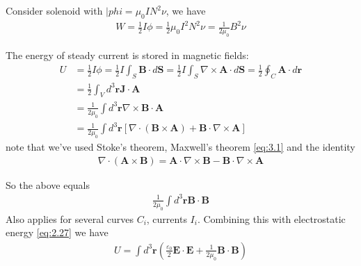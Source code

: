 \documentclass[a4paper]{article}
\begin{document}
\begin{eg}
Consider solenoid with $|phi=\mu_0 IN^2 \nu$, we have
\begin{equation*}
\begin{aligned}
W = \frac{1}{2}I\phi = \frac{1}{2} \mu_0 I^2 N^2 \nu = \frac{1}{2\mu_0} B^2 \nu
\end{aligned}
\end{equation*}

The energy of steady current is stored in magnetic fields:
\begin{equation*}
\begin{aligned}
U &= \frac{1}{2} I \phi = \frac{1}{2} I \int_S \mathbf{B} \cdot d\mathbf{S} = \frac{1}{2} I \int_S \nabla \times \mathbf{A} \cdot d\mathbf{S} = \frac{1}{2} \oint_C \mathbf{A} \cdot d\mathbf{r}\\
&= \frac{1}{2} \int_V d^3 \mathbf{r} \mathbf{J} \cdot \mathbf{A}\\
&= \frac{1}{2\mu_0} \int d^3 \mathbf{r} \nabla \times \mathbf{B} \cdot \mathbf{A}\\
&= \frac{1}{2\mu_0} \int d^3 \mathbf{r} [\nabla \cdot (\mathbf{B} \times \mathbf{A}) + \mathbf{B} \cdot \nabla \times \mathbf{A}]
\end{aligned}
\end{equation*}
note that we've used Stoke's theorem, Maxwell's theorem \eqref{eq:3.1} and  the identity
\begin{equation*}
\begin{aligned}
\nabla \cdot (\mathbf{A} \times \mathbf{B}) = \mathbf{A} \cdot \nabla \times \mathbf{B} - \mathbf{B} \cdot \nabla \times \mathbf{A}
\end{aligned}
\end{equation*}
\end{eg}
So the above equals
\begin{equation*}\tag{4.12} \label{eq:4.12}
\begin{aligned}
\frac{1}{2\mu_0} \int d^3 \mathbf{r} \mathbf{B} \cdot \mathbf{B}
\end{aligned}
\end{equation*}
Also applies for several curves $C_i$, currents $I_i$. Combining this with electrostatic energy \eqref{eq:2.27} we have
\begin{equation*}\tag{4.13} \label{eq:4.13}
\begin{aligned}
U = \int d^3 \mathbf{r} \left(\frac{\varepsilon_0}{2} \mathbf{E} \cdot \mathbf{E} + \frac{1}{2\mu_0} \mathbf{B} \cdot \mathbf{B}\right)
\end{aligned}
\end{equation*}
\end{document}
